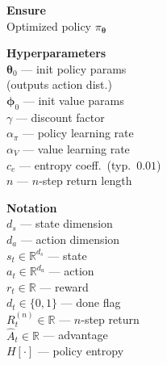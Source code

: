 \documentclass[11pt]{article}
\begin{document}

\begin{algorithm}[p]\small
\caption{A2C --- Advantage Actor-Critic}\label{alg:a2c}
\vspace{2pt}
\noindent
\begin{minipage}[t]{0.28\linewidth}
\renewcommand{\arraystretch}{1.12}
\textbf{Ensure} \\[2pt]
Optimized policy $\pi_{\boldsymbol{\theta}}$

\vspace{6pt}
\textbf{Hyperparameters} \\[2pt]
$\boldsymbol{\theta}_0$ --- init policy params \\
\hspace*{1em}(outputs action dist.) \\
$\boldsymbol{\phi}_0$ --- init value params \\
$\gamma$ --- discount factor \\
$\alpha_\pi$ --- policy learning rate \\
$\alpha_V$ --- value learning rate \\
$c_e$ --- entropy coeff.\ (typ.\ $0.01$) \\
$n$ --- $n$-step return length

\vspace{6pt}
\textbf{Notation} \\[2pt]
$d_s$ --- state dimension \\
$d_a$ --- action dimension \\
$s_t \in \mathbb{R}^{d_s}$ --- state \\
$a_t \in \mathbb{R}^{d_a}$ --- action \\
$r_t \in \mathbb{R}$ --- reward \\
$d_t \in \{0,1\}$ --- done flag \\
$R_t^{(n)} \in \mathbb{R}$ --- $n$-step return \\
$\hat{A}_t \in \mathbb{R}$ --- advantage \\
$H[\cdot]$ --- policy entropy


\end{minipage}
\end{algorithm}
\end{document}
